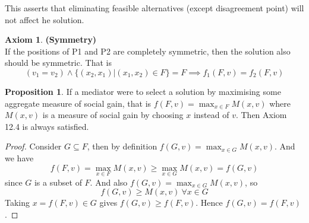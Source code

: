 \documentclass{article}
\theoremstyle{definition}
\newtheorem{prop}{Proposition}[section]
\newtheorem{ax}{Axiom}[section]
\begin{document}
This asserts that eliminating feasible alternatives (except disagreement point) will not affect he solution.
\begin{ax}
\textbf{(Symmetry)}\\
If the positions of P1 and P2 are completely symmetric, then the solution also should be symmetric. That is $$(v_1= v_2) \land \{(x_2,x_1)|(x_1,x_2)\in F\} = F \implies f_1(F,v) = f_2(F,v)$$
\end{ax}
\begin{prop}
If a mediator were to select a solution by maximising some aggregate measure of social gain, that is $f(F,v) = \max_{x\in F} M(x,v)$ where $M(x,v)$ is a measure of social gain by choosing $x$ instead of $v$. Then Axiom 12.4 is always satisfied.
\end{prop}
\begin{proof}
Consider $G\subseteq F$, then by definition $f(G,v) = \max_{x\in G} M(x,v)$. And we have $$f(F,v) = \max_{x\in F} M(x,v) \geq \max_{x\in G}M(x,v) = f(G,v)$$ since $G$ is a subset of $F$. And also $f(G,v) = \max_{x\in G} M(x,v)$, so $$f(G,v) \geq M(x,v)~\forall x \in G$$ Taking $x = f(F,v) \in G$ gives $f(G,v) \geq f(F,v)$. Hence $f(G,v) = f(F,v)$.
\end{proof}
\end{document}
